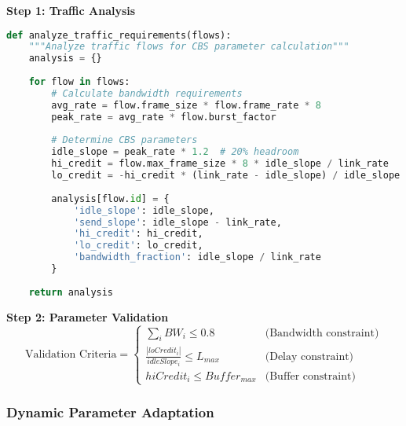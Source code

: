 \documentclass[10pt, journal, compsoc]{IEEEtran}
\begin{document}
\textbf{Step 1: Traffic Analysis}
\begin{lstlisting}[language=python, caption=Traffic Analysis Tool]
def analyze_traffic_requirements(flows):
    """Analyze traffic flows for CBS parameter calculation"""
    analysis = {}
    
    for flow in flows:
        # Calculate bandwidth requirements
        avg_rate = flow.frame_size * flow.frame_rate * 8
        peak_rate = avg_rate * flow.burst_factor
        
        # Determine CBS parameters
        idle_slope = peak_rate * 1.2  # 20% headroom
        hi_credit = flow.max_frame_size * 8 * idle_slope / link_rate
        lo_credit = -hi_credit * (link_rate - idle_slope) / idle_slope
        
        analysis[flow.id] = {
            'idle_slope': idle_slope,
            'send_slope': idle_slope - link_rate,
            'hi_credit': hi_credit,
            'lo_credit': lo_credit,
            'bandwidth_fraction': idle_slope / link_rate
        }
    
    return analysis
\end{lstlisting}

\textbf{Step 2: Parameter Validation}
\begin{equation}
\text{Validation Criteria} = \begin{cases}
\sum_{i} BW_i \leq 0.8 & \text{(Bandwidth constraint)} \\
\frac{|loCredit_i|}{idleSlope_i} \leq L_{max} & \text{(Delay constraint)} \\
hiCredit_i \leq Buffer_{max} & \text{(Buffer constraint)}
\end{cases}
\end{equation}

\subsubsection{Dynamic Parameter Adaptation}
\end{document}
